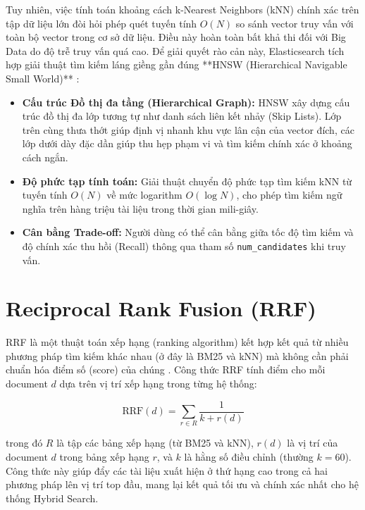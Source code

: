 Tuy nhiên, việc tính toán khoảng cách k-Nearest Neighbors (kNN) chính xác trên tập dữ liệu lớn đòi hỏi phép quét tuyến tính $O(N)$ so sánh vector truy vấn với toàn bộ vector trong cơ sở dữ liệu. Điều này hoàn toàn bất khả thi đối với Big Data do độ trễ truy vấn quá cao. Để giải quyết rào cản này, Elasticsearch tích hợp giải thuật tìm kiếm láng giềng gần đúng **HNSW (Hierarchical Navigable Small World)** \cite{malkov2018hnsw}:
\begin{itemize}
    \item \textbf{Cấu trúc Đồ thị đa tầng (Hierarchical Graph):} HNSW xây dựng cấu trúc đồ thị đa lớp tương tự như danh sách liên kết nhảy (Skip Lists). Lớp trên cùng thưa thớt giúp định vị nhanh khu vực lân cận của vector đích, các lớp dưới dày đặc dần giúp thu hẹp phạm vi và tìm kiếm chính xác ở khoảng cách ngắn.
    \item \textbf{Độ phức tạp tính toán:} Giải thuật chuyển độ phức tạp tìm kiếm kNN từ tuyến tính $O(N)$ về mức logarithm $O(\log N)$, cho phép tìm kiếm ngữ nghĩa trên hàng triệu tài liệu trong thời gian mili-giây.
    \item \textbf{Cân bằng Trade-off:} Người dùng có thể cân bằng giữa tốc độ tìm kiếm và độ chính xác thu hồi (Recall) thông qua tham số \texttt{num\_candidates} khi truy vấn.
\end{itemize}


\section{Reciprocal Rank Fusion (RRF)}
RRF là một thuật toán xếp hạng (ranking algorithm) kết hợp kết quả từ nhiều phương pháp tìm kiếm khác nhau (ở đây là BM25 và kNN) mà không cần phải chuẩn hóa điểm số (score) của chúng \cite{cormack2009rrf}. Công thức RRF tính điểm cho mỗi document $d$ dựa trên vị trí xếp hạng trong từng hệ thống:

\[
\text{RRF}(d) = \sum_{r \in R} \frac{1}{k + r(d)}
\]

trong đó $R$ là tập các bảng xếp hạng (từ BM25 và kNN), $r(d)$ là vị trí của document $d$ trong bảng xếp hạng $r$, và $k$ là hằng số điều chỉnh (thường $k = 60$). Công thức này giúp đẩy các tài liệu xuất hiện ở thứ hạng cao trong cả hai phương pháp lên vị trí top đầu, mang lại kết quả tối ưu và chính xác nhất cho hệ thống Hybrid Search.